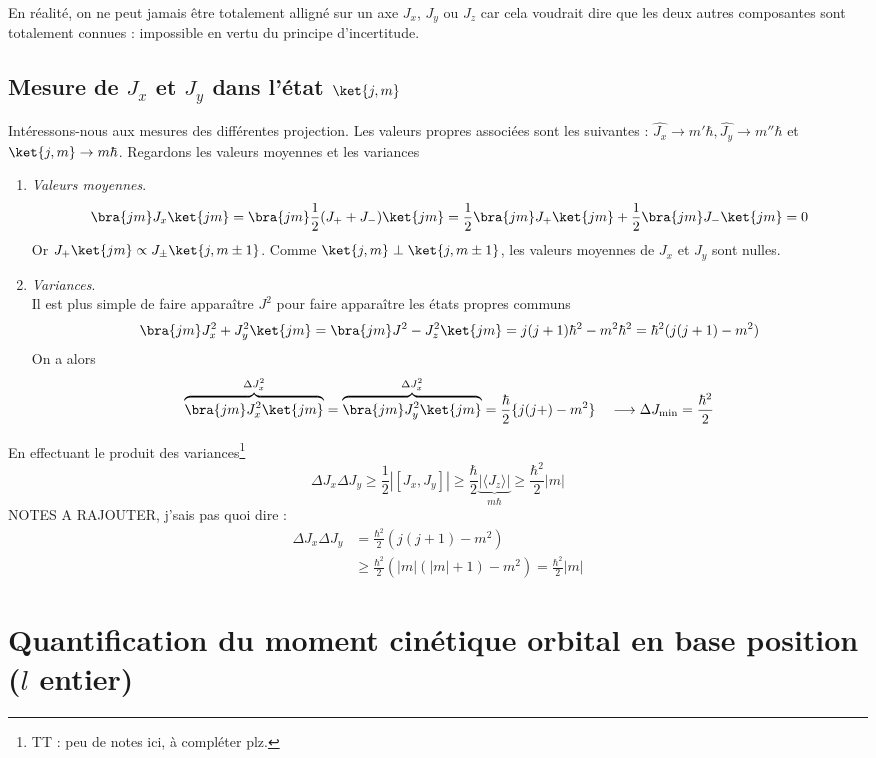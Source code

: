 	En réalité, on ne peut jamais être totalement alligné sur un axe $J_x$, $J_y$ ou $J_z$ car cela 
	voudrait dire que les deux autres composantes sont totalement connues : impossible en vertu du 
	principe d'incertitude.



	\subsection{Mesure de $J_x$ et $J_y$ dans l'état $\ket{j,m}$}
	Intéressons-nous aux mesures des différentes projection. Les valeurs propres associées sont 
	les suivantes : $\hat{J_x}\rightarrow m'\hbar, \hat{J_y}\rightarrow m''\hbar$ et 
	$\ket{j,m}\rightarrow m\hbar$. Regardons les valeurs moyennes et les variances
	\begin{enumerate}
	\item \textit{Valeurs moyennes}.
	\begin{equation}
	\bra{jm}J_x\ket{jm} = \bra{jm}\frac{1}{2}(J_++J_-)\ket{jm} = \frac{1}{2}\bra{jm}J_+\ket{jm}+
	\frac{1}{2}\bra{jm}J_-\ket{jm} =0
	\end{equation}
	Or $J_+\ket{jm}\propto J_\pm\ket{j,m\pm 1}$. Comme $\ket{j,m}\perp\ket{j,m\pm1}$, les valeurs 
	moyennes de $J_x$ et $J_y$ sont nulles.
	\item \textit{Variances}.\\
	Il est plus simple de faire apparaître $J^2$ pour faire apparaître les états propres communs
	\begin{equation}
	\bra{jm} J_x^2+J_y^2 \ket{jm}= \bra{jm}J^2-J_z^2 \ket{jm} = j(j+1)\hbar^2-m^2\hbar^2 = \hbar^2(j(j+1)
	-m^2)
	\end{equation}
	On a alors
	\begin{equation}
	\overbrace{\bra{jm}J_x^2\ket{jm}}^{\Delta J_x^2} = \overbrace{\bra{jm}J_y^2\ket{jm}}^{\Delta J_x^2} 
	= \frac{\hbar}{2}\{j(j+)-m^2\}\quad \longrightarrow \Delta J_{\min} = \frac{\hbar^2}{2}
	\end{equation}	
	\end{enumerate}
	En effectuant le produit des variances\footnote{TT : peu de notes ici, à compléter plz.}
	\begin{equation}
	\Delta J_x\Delta J_y \geq \frac{1}{2}|[J_x,J_y]| \geq \frac{\hbar}{2}\underbrace{|\langle J_z\rangle|}_{m
	\hbar} \geq \frac{\hbar^2}{2}|m|
	\end{equation}
	NOTES A RAJOUTER, j'sais pas quoi dire :
	\begin{equation}
	\begin{array}{ll}
	\Delta J_x\Delta J_y &= \frac{\hbar^2}{2}(j(j+1)-m^2)\\
	&\geq \frac{\hbar^2}{2}(|m|(|m|+1)-m^2) = \frac{\hbar^2}{2}|m|
	\end{array}
	\end{equation}









	

\section{Quantification du moment cinétique orbital en base position ($l$ entier)}
